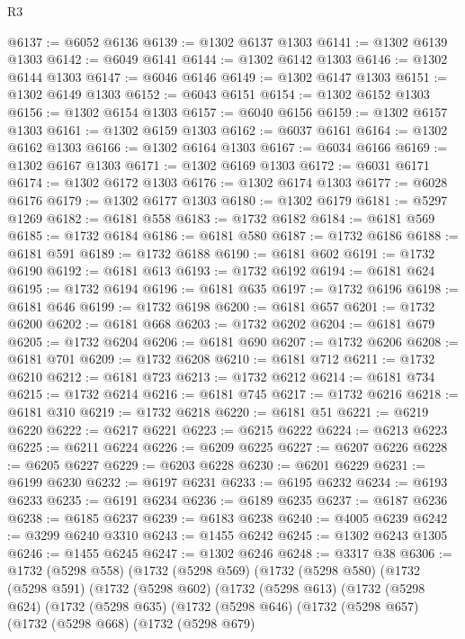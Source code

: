 \begin{lexlean}{R3}
\begin{coremodule}
@6137 := @6052 @6136
@6139 := @1302 @6137 @1303
@6141 := @1302 @6139 @1303
@6142 := @6049 @6141
@6144 := @1302 @6142 @1303
@6146 := @1302 @6144 @1303
@6147 := @6046 @6146
@6149 := @1302 @6147 @1303
@6151 := @1302 @6149 @1303
@6152 := @6043 @6151
@6154 := @1302 @6152 @1303
@6156 := @1302 @6154 @1303
@6157 := @6040 @6156
@6159 := @1302 @6157 @1303
@6161 := @1302 @6159 @1303
@6162 := @6037 @6161
@6164 := @1302 @6162 @1303
@6166 := @1302 @6164 @1303
@6167 := @6034 @6166
@6169 := @1302 @6167 @1303
@6171 := @1302 @6169 @1303
@6172 := @6031 @6171
@6174 := @1302 @6172 @1303
@6176 := @1302 @6174 @1303
@6177 := @6028 @6176
@6179 := @1302 @6177 @1303
@6180 := @1302 @6179
@6181 := @5297 @1269
@6182 := @6181 @558
@6183 := @1732 @6182
@6184 := @6181 @569
@6185 := @1732 @6184
@6186 := @6181 @580
@6187 := @1732 @6186
@6188 := @6181 @591
@6189 := @1732 @6188
@6190 := @6181 @602
@6191 := @1732 @6190
@6192 := @6181 @613
@6193 := @1732 @6192
@6194 := @6181 @624
@6195 := @1732 @6194
@6196 := @6181 @635
@6197 := @1732 @6196
@6198 := @6181 @646
@6199 := @1732 @6198
@6200 := @6181 @657
@6201 := @1732 @6200
@6202 := @6181 @668
@6203 := @1732 @6202
@6204 := @6181 @679
@6205 := @1732 @6204
@6206 := @6181 @690
@6207 := @1732 @6206
@6208 := @6181 @701
@6209 := @1732 @6208
@6210 := @6181 @712
@6211 := @1732 @6210
@6212 := @6181 @723
@6213 := @1732 @6212
@6214 := @6181 @734
@6215 := @1732 @6214
@6216 := @6181 @745
@6217 := @1732 @6216
@6218 := @6181 @310
@6219 := @1732 @6218
@6220 := @6181 @51
@6221 := @6219 @6220
@6222 := @6217 @6221
@6223 := @6215 @6222
@6224 := @6213 @6223
@6225 := @6211 @6224
@6226 := @6209 @6225
@6227 := @6207 @6226
@6228 := @6205 @6227
@6229 := @6203 @6228
@6230 := @6201 @6229
@6231 := @6199 @6230
@6232 := @6197 @6231
@6233 := @6195 @6232
@6234 := @6193 @6233
@6235 := @6191 @6234
@6236 := @6189 @6235
@6237 := @6187 @6236
@6238 := @6185 @6237
@6239 := @6183 @6238
@6240 := @4005 @6239
@6242 := @3299 @6240 @3310
@6243 := @1455 @6242
@6245 := @1302 @6243 @1305
@6246 := @1455 @6245
@6247 := @1302 @6246
@6248 := @3317 @38
@6306 := @1732
    (@5298 @558)
    (@1732
      (@5298 @569)
      (@1732
        (@5298 @580)
        (@1732
          (@5298 @591)
          (@1732
            (@5298 @602)
            (@1732
              (@5298 @613)
              (@1732
                (@5298 @624)
                (@1732
                  (@5298 @635)
                  (@1732
                    (@5298 @646)
                    (@1732
                      (@5298 @657)
                      (@1732
                        (@5298 @668)
                        (@1732
                          (@5298 @679)

\end{coremodule}
\end{lexlean}
